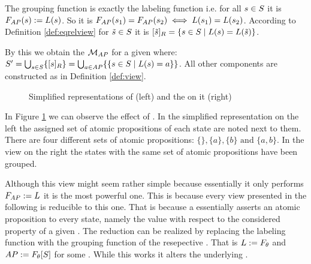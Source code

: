\documentclass[preview]{standalone}
\begin{document}
The grouping function is exactly the labeling function i.e. for all ${s} \in {S}$ it is ${{F_{{{AP}}}}}({s}) := {L}({s})$. So it is ${{F_{{{AP}}}}}({s}_1) = {{F_{{{AP}}}}}({s}_2) \iff {L}({s}_1) = {L}({s}_2)$. According to Definition \ref{def:eqrelview} for ${\tilde{{s}}} \in {S}$ it is ${{[{\tilde{{s}}}]_{{R}}}} = \{{s} \in {S} \mid {L}({s}) = {L}({\tilde{{s}}})\}$.

By this we obtain the \viewN ${{{{{\mathcal{M}}}}_{{{AP}}}}}$ for a given \chgphN \chgph where: ${S}' = \bigcup_{{s} \in {S}} \{{{[{s}]_{{R}}}}\} =  \bigcup_{a \in {AP}} \{\{{s} \in {S} \mid {L}({s}) = a\}\}$. All other components are constructed as in Definition \ref{def:view}.

\begin{figure}[h]
	\begin{minipage}{.6\textwidth}
		
	\end{minipage}%
	\begin{minipage}{.5\textwidth}
		
	\end{minipage}
	\caption{Simplified representations of \mdp (left) and the \viewN \viewatomicprops on it (right)}
	\label{fig:apIdentBeforeAfter}  
\end{figure}

In Figure \ref{fig:apIdentBeforeAfter} we can observe the effect of \viewatomicprops. In the simplified representation on the left the assigned set of atomic propositions of each state are noted next to them. There are four different sets of atomic propositions: $\{\}, \{a\}, \{b\} \text{ and } \{a,b\}$. In the view on the right the states with the same set of atomic propositions have been grouped.

Although this view might seem rather simple because essentially it only performs ${{F_{{{AP}}}}} := {L}$ it is the most powerful one. This is because every view presented in the following is reducible to this one. That is because a \grpfctN essentially asserts an atomic proposition to every state, namely the value with respect to the considered property of a given \viewN. The reduction can be realized by replacing the labeling function with the grouping function of the resepective \viewN. That is ${L} := {F_{{\theta}}}$ and ${AP} := {{F_{{\theta}}}}[{S}]$ for some \grpfctN \grpfct. While this works it alters the underlying \chgphN.
\end{document}
